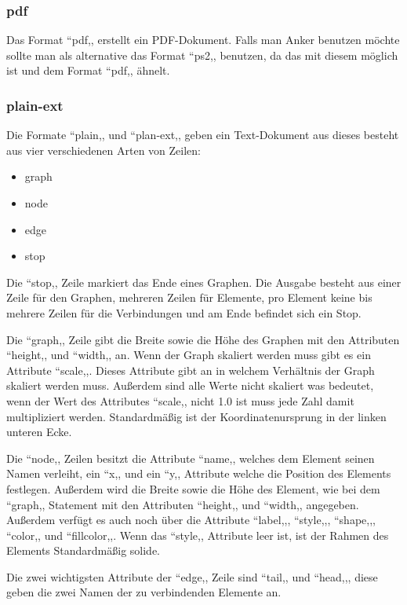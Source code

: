 \subsubsection{pdf}
\noindent
Das Format ``pdf,, erstellt ein PDF-Dokument.
Falls man Anker benutzen möchte sollte man als alternative das Format ``ps2,, benutzen, da das mit diesem möglich ist und dem Format ``pdf,, ähnelt.

\subsubsection{plain-ext}
\fib{}
Die Formate ``plain,, und ``plan-ext,, geben ein Text-Dokument aus dieses besteht aus vier verschiedenen Arten von Zeilen:
\begin{itemize}
	\item graph
	\item node
	\item edge
	\item stop
\end{itemize}
\noindent
Die ``stop,, Zeile markiert das Ende eines Graphen. Die Ausgabe besteht aus einer Zeile für den Graphen, mehreren Zeilen für Elemente, pro Element keine bis mehrere Zeilen für die Verbindungen und am Ende befindet sich ein Stop.

\noindent
Die ``graph,, Zeile gibt die Breite sowie die Höhe des Graphen mit den Attributen ``height,, und ``width,, an. Wenn der Graph skaliert werden muss gibt es ein Attribute ``scale,,. Dieses Attribute gibt an in welchem Verhältnis der Graph skaliert werden muss. Außerdem sind alle Werte nicht skaliert was bedeutet, wenn der Wert des Attributes ``scale,, nicht 1.0 ist muss jede Zahl damit multipliziert werden. Standardmäßig ist der Koordinatenursprung in der linken unteren Ecke.

\noindent
Die ``node,, Zeilen besitzt die Attribute ``name,, welches dem Element seinen Namen verleiht, ein ``x,, und ein ``y,, Attribute welche die Position des Elements festlegen. Außerdem wird die Breite sowie die Höhe des Element, wie bei dem ``graph,, Statement mit den Attributen ``height,, und ``width,, angegeben. Außerdem verfügt es auch noch über die Attribute ``label,,, ``style,,, ``shape,,, ``color,, und ``fillcolor,,. Wenn das ``style,, Attribute leer ist, ist der Rahmen des Elements Standardmäßig solide.

\noindent
Die zwei wichtigsten Attribute der ``edge,, Zeile sind ``tail,, und ``head,,, diese geben die zwei Namen der zu verbindenden Elemente an.


